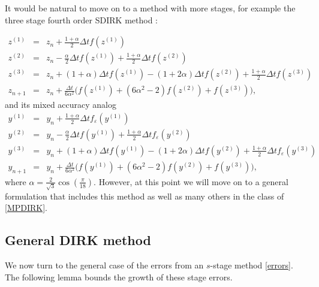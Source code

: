 \documentclass{siamart251104}
\newcommand{\dt}{\Delta t}
\begin{document}
It would be natural to move on to a method with more stages, for example
the three stage fourth order SDIRK method \cite{CrouzeixBstab}:
 
\begin{eqnarray}\label{SDIRK4} 
z^{(1)} & = & z_n + \frac{1+\alpha}{2} \dt f(z^{(1)})   \nonumber \\ 
z^{(2)} & = & z_n - \frac{\alpha}{2} \dt  f(z^{(1)}) 
+ \frac{1+\alpha}{2} \dt f(z^{(2)}) \nonumber\\
z^{(3)} & = & z_n + (1+\alpha) \dt  f(z^{(1)}) 
-  (1+2 \alpha)  \dt f(z^{(2)}) +\frac{1+\alpha}{2} \dt f(z^{(3)})  \nonumber\\
    z_{n+1} & = & z_n + \frac{\dt}{6 \alpha^2} \big(f(z^{(1)}) + (6 \alpha^2 -2) f(z^{(2)}) + f(z^{(3)})\big) ,
\end{eqnarray}
and its mixed accuracy analog
\begin{eqnarray} \label{MPSDIRK4}
y^{(1)} & = & y_n + \frac{1+\alpha}{2} \dt f_\varepsilon(y^{(1)})  \nonumber \\ 
y^{(2)} & = & y_n - \frac{\alpha}{2} \dt  f(y^{(1)}) 
+ \frac{1+\alpha}{2} \dt f_\varepsilon(y^{(2)}) \nonumber\\
y^{(3)} & = & y_n + (1+\alpha) \dt  f(y^{(1)}) 
-  (1+2 \alpha)  \dt f(y^{(2)}) 
+\frac{1+\alpha}{2} \dt f_\varepsilon(y^{(3)})  \nonumber \\
    y_{n+1} & = & y_n + \frac{\dt}{6 \alpha^2} \big(f(y^{(1)}) 
    + (6 \alpha^2 -2) f(y^{(2)}) + f(y^{(3)})\big) ,
\end{eqnarray}
where $\alpha = \frac{2}{\sqrt{3}} \cos(\frac{\pi}{18}) $.
However, at this point we will move on to a general formulation that includes this method
as well as many others in the class of \eqref{MPDIRK}.

\subsection{General DIRK method}
We now turn to the general case of the 
errors from an $s$-stage method \eqref{errors}.
The following lemma
bounds the growth of these stage errors.
\end{document}

